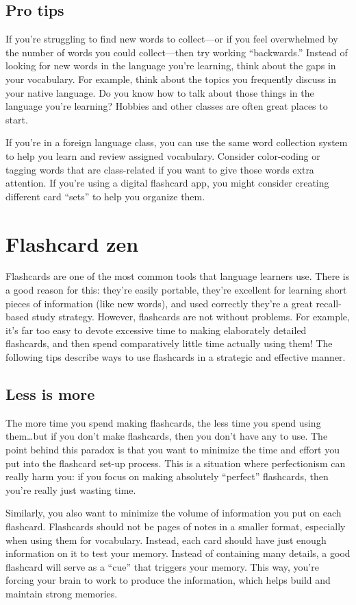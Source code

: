 \documentclass[../main.tex]{subfiles}
\begin{document}
\subsection{Pro tips}
If you’re struggling to find new words to collect—or if you feel overwhelmed by
the number of words you could collect—then try working “backwards.” Instead of
looking for new words in the language you’re learning, think about the gaps in
your vocabulary. For example, think about the topics you frequently discuss in
your native language. Do you know how to talk about those things in the language
you’re learning? Hobbies and other classes are often great places to start.

If you’re in a foreign language class, you can use the same word collection
system to help you learn and review assigned vocabulary. Consider color-coding
or tagging words that are class-related if you want to give those words extra
attention. If you’re using a digital flashcard app, you might consider creating
different card “sets” to help you organize them.
%
\section{Flashcard zen}
Flashcards are one of the most common tools that language learners use. There is
a good reason for this: they’re easily portable, they’re excellent for learning
short pieces of information (like new words), and used correctly they’re a great
recall-based study strategy. However, flashcards are not without problems. For
example, it’s far too easy to devote excessive time to making elaborately
detailed flashcards, and then spend comparatively little time actually using
them! The following tips describe ways to use flashcards in a strategic and
effective manner.
%
\subsection{Less is more}
The more time you spend making flashcards, the less time you spend using
them…but if you don’t make flashcards, then you don’t have any to use. The point
behind this paradox is that you want to minimize the time and effort you put
into the flashcard set-up process. This is a situation where perfectionism can
really harm you: if you focus on making absolutely “perfect” flashcards, then
you’re really just wasting time.

Similarly, you also want to minimize the volume of information you put on each
flashcard. Flashcards should not be pages of notes in a smaller format,
especially when using them for vocabulary. Instead, each card should have just
enough information on it to test your memory. Instead of containing many
details, a good flashcard will serve as a “cue” that triggers your memory. This
way, you’re forcing your brain to work to produce the information, which helps
build and maintain strong memories.
%
\end{document}
